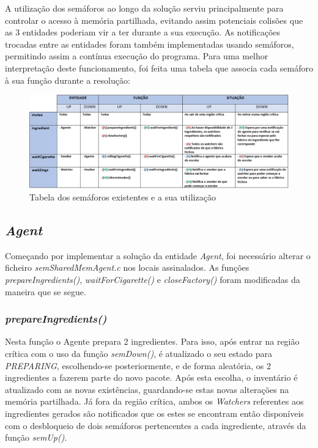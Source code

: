 \documentclass[10pt,portuguese]{article}
\begin{document}
\par A utilização dos semáforos ao longo da solução serviu principalmente para controlar o acesso à memória partilhada, evitando assim potenciais colisões que as 3 entidades poderiam vir a ter durante a sua execução. As notificações trocadas entre as entidades foram também implementadas usando semáforos, permitindo assim a contínua execução do programa. Para uma melhor interpretação deste funcionamento, foi feita uma tabela que associa cada semáforo à sua função durante a resolução:\\
\begin{figure}[!h]
    \centering
    \includegraphics[width=\textwidth]{images/implementation/table.png}
    \caption{Tabela dos semáforos existentes e a sua utilização}
\end{figure}

\clearpage

\subsection{\textit{Agent}}

\par Começando por implementar a solução da entidade \textit{Agent}, foi necessário alterar o ficheiro \textit{semSharedMemAgent.c} nos locais assinalados. As funções \textit{prepareIngredients()}, \textit{waitForCigarette()} e \textit{closeFactory()} foram modificadas da maneira que se segue.

\subsubsection{\textit{prepareIngredients()}}

\par Nesta função o Agente prepara 2 ingredientes. Para isso, após entrar na região crítica com o uso da função \textit{semDown()}, é atualizado o seu estado para \textit{PREPARING}, escolhendo-se posteriormente, e de forma aleatória, os 2 ingredientes a fazerem parte do novo pacote. Após esta escolha, o inventário é atualizado com as novas existências, guardando-se estas novas alterações na memória partilhada. Já fora da região crítica, ambos os \textit{Watchers} referentes aos ingredientes gerados são notificados que os estes se encontram então disponíveis com o desbloqueio de dois semáforos pertencentes a cada ingrediente, através da função \textit{semUp()}.
\end{document}
